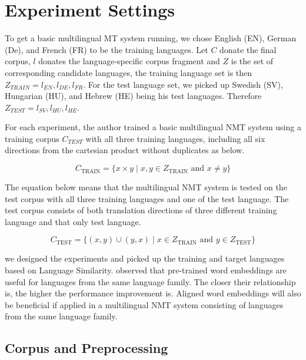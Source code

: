\documentclass[thesis,fonts=libertine]{cluu}
\begin{document}
\section{Experiment Settings}
\label{sec:initial_exp_settings}

To get a basic multilingual MT system running, we chose English (EN), German (De), and French (FR) to be the training languages. Let $C$ donate the final corpus, $l$ donates the language-specific corpus fragment and $Z$ is the set of corresponding candidate languages, the training language set is then $Z_{TRAIN} = {l_{EN}, l_{DE}, l_{FR}}$. For the test language set, we picked up Swedish (SV), Hungarian (HU), and Hebrew (HE) being his test languages. Therefore $Z_{TEST} = {l_{SV}, l_{HU}, l_{HE}}$.

For each experiment, the author trained a basic multilingual NMT system using a training corpus $C_{TEST}$ with all three training languages, including all six directions from the cartesian product without duplicates as below.

\begin{equation}
  C_{\text{TRAIN}} = \{x \times y \mid x, y \in Z_{\text{TRAIN}} \text{ and } x \neq y\}
\end{equation}

The equation below means that the multilingual NMT system is tested on the test corpus with all three training languages and one of the test language. The test corpus consists of both translation directions of three different training language and that only test language.

\begin{equation}
  C_{\text{TEST}} = \{(x, y)\cup(y,x) \mid x \in Z_{\text{TRAIN}} \text{ and } y \in Z_{\text{TEST}}\}
\end{equation}

we designed the experiments and picked up the training and target languages based on Language Similarity. \textcite{Qi:2018aa} observed that pre-trained word embeddings are useful for languages from the same language family. The closer their relationship is, the higher the performance improvement is. Aligned word embeddings will also be beneficial if applied in a multilingual NMT system consisting of languages from the same language family.

\subsection{Corpus and Preprocessing}
\end{document}
